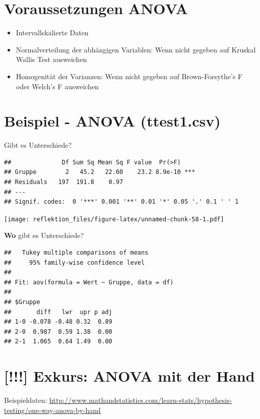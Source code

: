 \documentclass[
]{book}
\providecommand{\tightlist}{%
  \setlength{\itemsep}{0pt}\setlength{\parskip}{0pt}}
\begin{document}
\hypertarget{voraussetzungen-anova}{%
\section{Voraussetzungen ANOVA}\label{voraussetzungen-anova}}

\begin{itemize}
\tightlist
\item
  Intervallskalierte Daten
\item
  Normalverteilung der abhängigen Variablen: Wenn nicht gegeben auf Kruskal Wallis Test ausweichen
\item
  Homogenität der Varianzen: Wenn nicht gegeben auf Brown-Forsythe's F oder Welch's F ausweichen
\end{itemize}

\hypertarget{beispiel---anova-ttest1.csv}{%
\section{Beispiel - ANOVA (ttest1.csv)}\label{beispiel---anova-ttest1.csv}}

Gibt es Unterschiede?

\begin{verbatim}
##              Df Sum Sq Mean Sq F value  Pr(>F)    
## Gruppe        2   45.2   22.60    23.2 8.9e-10 ***
## Residuals   197  191.8    0.97                    
## ---
## Signif. codes:  0 '***' 0.001 '**' 0.01 '*' 0.05 '.' 0.1 ' ' 1
\end{verbatim}

\texttt{[image: reflektion\_files/figure-latex/unnamed-chunk-58-1.pdf]}

\textbf{Wo} gibt es Unterschiede?

\begin{verbatim}
##   Tukey multiple comparisons of means
##     95% family-wise confidence level
## 
## Fit: aov(formula = Wert ~ Gruppe, data = df)
## 
## $Gruppe
##       diff   lwr  upr p adj
## 1-0 -0.078 -0.48 0.32  0.89
## 2-0  0.987  0.59 1.38  0.00
## 2-1  1.065  0.64 1.49  0.00
\end{verbatim}

\hypertarget{exkurs-anova-mit-der-hand}{%
\section{{[}!!!{]} Exkurs: ANOVA mit der Hand}\label{exkurs-anova-mit-der-hand}}

Beispieldaten: \url{http://www.mathandstatistics.com/learn-stats/hypothesis-testing/one-way-anova-by-hand}
\end{document}
